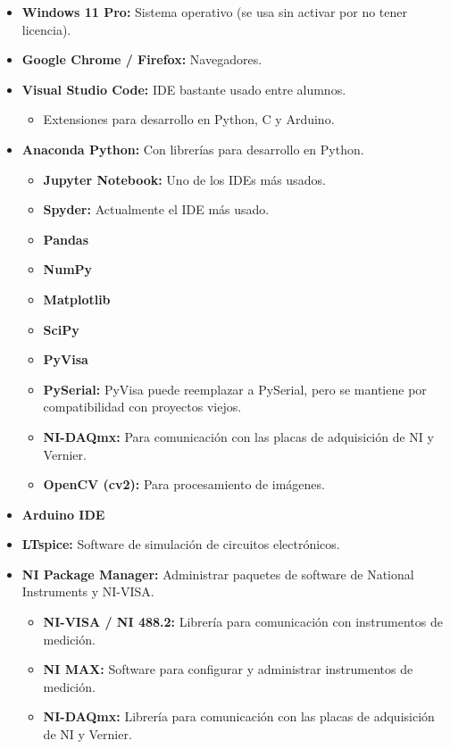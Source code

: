 \begin{itemize}
    \item \textbf{Windows 11 Pro:} Sistema operativo (se usa sin activar por no tener licencia).
    \item \textbf{Google Chrome / Firefox:} Navegadores.
    \item \textbf{Visual Studio Code:} IDE bastante usado entre alumnos.
    \begin{itemize}
        \item Extensiones para desarrollo en Python, C y Arduino.
    \end{itemize}
    \item \textbf{Anaconda Python:} Con librerías para desarrollo en Python.
    \begin{itemize}
        \item \textbf{Jupyter Notebook:} Uno de los IDEs más usados.
        \item \textbf{Spyder:} Actualmente el IDE más usado.
        \item \textbf{Pandas}
        \item \textbf{NumPy}
        \item \textbf{Matplotlib}
        \item \textbf{SciPy}
        \item \textbf{PyVisa}
        \item \textbf{PySerial:} PyVisa puede reemplazar a PySerial, pero se mantiene por compatibilidad con proyectos viejos.
        \item \textbf{NI-DAQmx:} Para comunicación con las placas de adquisición de NI y Vernier.
        \item \textbf{OpenCV (cv2):} Para procesamiento de imágenes.
    \end{itemize}
    \item \textbf{Arduino IDE}
    \item \textbf{LTspice:} Software de simulación de circuitos electrónicos.
    \item \textbf{NI Package Manager:} Administrar paquetes de software de National Instruments y NI-VISA.
    \begin{itemize}
        \item \textbf{NI-VISA / NI 488.2:} Librería para comunicación con instrumentos de medición.
        \item \textbf{NI MAX:} Software para configurar y administrar instrumentos de medición.
        \item \textbf{NI-DAQmx:} Librería para comunicación con las placas de adquisición de NI y Vernier.

\end{itemize}
\end{itemize}
